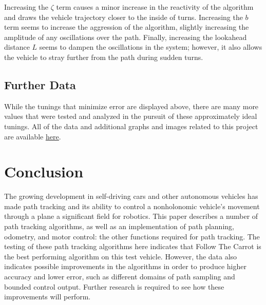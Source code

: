 \documentclass[mla8alt]{mla}
\begin{document}
\begin{paper}
\begin{figure}[H]
\endminipage
\end{figure}

Increasing the $\zeta$ term causes a minor increase in the reactivity of the algorithm and draws the vehicle trajectory closer to the inside of turns. Increasing the $b$ term seems to increase the aggression of the algorithm, slightly increasing the amplitude of any oscillations over the path. Finally, increasing the lookahead distance $L$ seems to dampen the oscillations in the system; however, it also allows the vehicle to stray further from the path during sudden turns.

\subsection{Further Data}

While the tunings that minimize error are displayed above, there are many more values that were tested and analyzed in the pursuit of these approximately ideal tunings. All of the data and additional graphs and images related to this project are available \href{https://github.com/SpencerJ21/pathtracking/tree/develop/scripts/analysis}{\underline{here}}.

\section{Conclusion}

The growing development in self-driving cars and other autonomous vehicles has made path tracking and its ability to control a nonholonomic vehicle's movement through a plane a significant field for robotics. This paper describes a number of path tracking algorithms, as well as an implementation of path planning, odometry, and motor control: the other functions required for path tracking. The testing of these path tracking algorithms here indicates that Follow The Carrot is the best performing algorithm on this test vehicle. However, the data also indicates possible improvements in the algorithms in order to produce higher accuracy and lower error, such as different domains of path sampling and bounded control output. Further research is required to see how these improvements will perform.

\end{paper}
\end{document}
